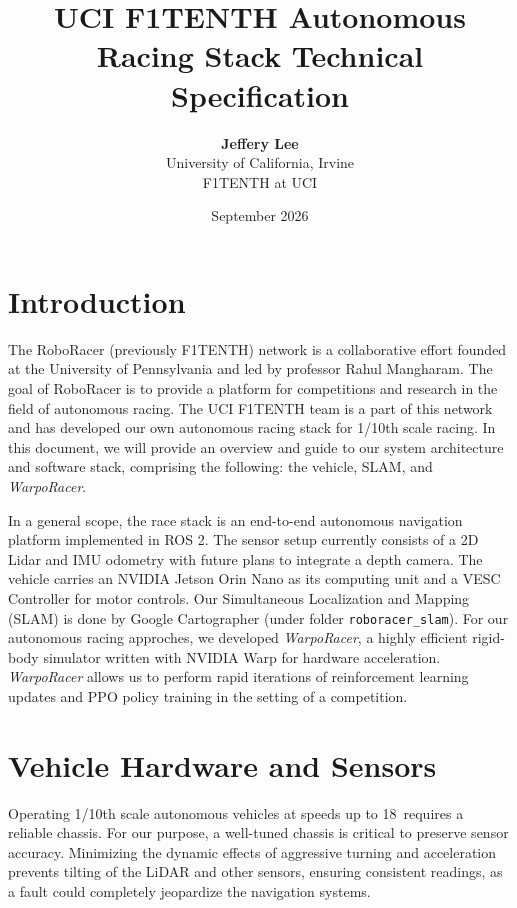 \documentclass[11pt,letterpaper]{article}
\title{\Large\textbf{UCI F1TENTH Autonomous Racing Stack Technical Specification}}
\author{\textbf{Jeffery Lee} \\ University of California, Irvine \\ F1TENTH at UCI}
\date{September 2026}
\begin{document}
\maketitle

\section{Introduction}
The RoboRacer (previously F1TENTH) network is a collaborative effort founded at the University of Pennsylvania and led by professor Rahul Mangharam. 
The goal of RoboRacer is to provide a platform for competitions and research in the field of autonomous racing. 
The UCI F1TENTH team is a part of this network and has developed our own autonomous racing stack for 1/10th scale racing. 
In this document, we will provide an overview and guide to our system architecture and software stack, comprising the following: the vehicle, SLAM, and \textit{WarpoRacer}.

In a general scope, the race stack is an end-to-end autonomous navigation platform implemented in ROS 2. The sensor setup currently consists of a 2D Lidar and IMU odometry with future plans to integrate a depth camera.
The vehicle carries an NVIDIA Jetson Orin Nano as its computing unit and a VESC Controller for motor controls.
Our Simultaneous Localization and Mapping (SLAM) is done by Google Cartographer (under folder \texttt{roboracer\_slam}). 
For our autonomous racing approches, we developed \textit{WarpoRacer}, a highly efficient rigid-body simulator written with NVIDIA Warp for hardware acceleration.
\textit{WarpoRacer} allows us to perform rapid iterations of reinforcement learning updates and PPO policy training in the setting of a competition.

\vspace{1em}

\section{Vehicle Hardware and Sensors}
Operating 1/10th scale autonomous vehicles at speeds up to 18\, requires a reliable chassis. For our purpose, a well-tuned chassis is critical to preserve sensor accuracy.
Minimizing the dynamic effects of aggressive turning and acceleration prevents tilting of the LiDAR and other sensors, ensuring consistent readings, as a fault could completely jeopardize the navigation systems.
\end{document}
